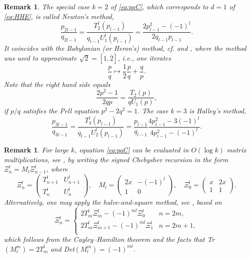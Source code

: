 \documentclass[a4paper,fleqn]{cas-sc}
\newtheorem{remark}[theorem]{Remark}
\begin{document}
\begin{remark}
The special case $k=2$ of \eqref{eq:pqC}, which corresponds to $d=1$ of \eqref{eq:HHE}, is called Newton's method,
\begin{equation} \label{Newton}
\frac{p_{2l-1}}{q_{2l-1}}=\frac{T^l_2(p_{l-1})}{q_{l-1}U^l_{1}(p_{l-1})}
=\frac{2p_{l-1}^2-(-1)^l}{2q_{l-1}p_{l-1}}.
\end{equation}
It coincides with the Babylonian (or Heron's) method, cf. \cite{YD} and \cite{O1}, where the method was used to approximate $\sqrt{2}=[1,\overline{2}]$, i.e., one iterates
\[
\frac{p}{q}\mapsto\frac{1}{2}\frac{p}{q}+\frac{q}{p}.
\]
Note that the right hand side equals
\[
\frac{2p^{2}-1}{2 q p}=\frac{T_2(p)}{qU_{1}(p)},
\]
if $p/q$ satisfies the Pell equation $p^2-2q^2=1$. The case $k=3$ is Halley's method,
\begin{equation} \label{Halley}
\frac{p_{3l-1}}{q_{3l-1}}=\frac{T^l_3(p_{l-1})}{q_{l-1}U^l_{2}(p_{l-1})}
=\frac{p_{l -1}}{q_{l -1}} \frac{4 p_{l -1}^{2}-3 \left(-1\right)^{l}}{4p_{l-1}^{2}-\left(-1\right)^{l}}.
\end{equation}
\end{remark}

\begin{remark}
For large $k$, equation \eqref{eq:pqC} can be evaluated in $O(\log k)$ matrix multiplications, see \cite[Section 3.1]{CLH}, by writing the signed Chebyshev recursion in the form $\Xi^l_n=M_l\Xi^l_{n-1}$, where
\begin{equation} \label{eq:mbm}
\Xi^l_n=
\begin{pmatrix}
T^l_{n+1} & U^l_{n+1} \\
T^l_{n} & U^l_{n}
\end{pmatrix},\quad
M_l=
\begin{pmatrix}
2x & -(-1)^l \\
1 & 0
\end{pmatrix},\quad
\Xi^l_0=\begin{pmatrix}
x & 2x \\
1 & 1
\end{pmatrix}.
\end{equation}
Alternatively, one may apply the halve-and-square method, see \cite[Section 3.2]{CLH}, based on
\begin{equation} \label{has}
\Xi^l_{n}=\begin{cases}
2T^l_m\Xi^l_m-(-1)^{ml}\Xi^l_0 & n = 2m, \\
2T^l_m\Xi^l_{m+1}-(-1)^{ml}\Xi^l_1 & n = 2m +1, \\
\end{cases}
\end{equation}
which follows from the Cayley--Hamilton theorem and the facts that Tr$(M_l^m)=2T^l_m$ and Det$(M_l^m)=(-1)^{ml}$. 
\end{remark}
\end{document}
